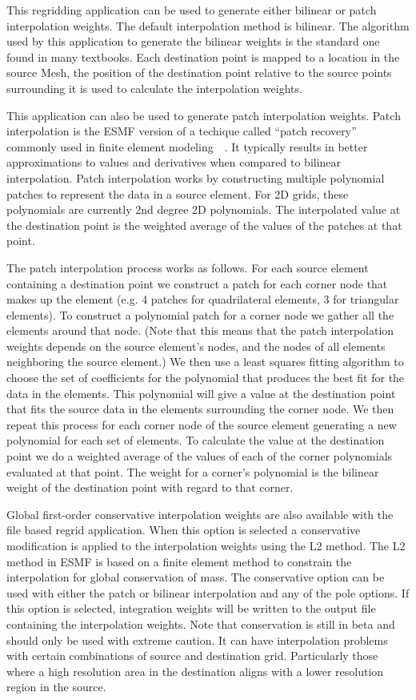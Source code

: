  This regridding application can be used to generate either bilinear or patch interpolation weights. The default interpolation method
is bilinear. The algorithm used by this application to generate the bilinear weights is the standard one found in
many textbooks.  Each destination point is mapped to a location in the source Mesh, the position of the destination point relative 
to the source points surrounding it is used to calculate the interpolation weights. 

 This application can also be used to generate patch interpolation weights. Patch
interpolation is the ESMF version of a techique called ``patch recovery'' commonly
used in finite element modeling~\cite{PatchInterp1}~\cite{PatchInterp2}. It typically results in better approximations to values and derivatives when compared to bilinear interpolation.  
Patch interpolation works by constructing multiple polynomial patches to represent
the data in a source element. For 2D grids, these polynomials 
are currently 2nd degree 2D polynomials. The interpolated value at the destination point 
is the weighted average of the values of the patches at that point. 

The patch interpolation process works as follows. 
For each source element containing a destination point
we construct a patch for each corner node that makes up the element (e.g. 4 patches for 
quadrilateral elements, 3 for triangular elements). To construct a polynomial patch for
 a corner node we gather all the elements around that node. 
(Note that this means that the patch interpolation weights depends on the source 
element's nodes, and the nodes of all elements neighboring the source element.)  
We then use a least squares fitting algorithm to choose the set of coefficients 
for the polynomial that produces the best fit for the data in the elements. 
This polynomial will give a value at the destination point that fits the source data 
in the elements surrounding the corner node. We then repeat this process for each 
corner node of the source element generating a new polynomial for each set of elements.  
To calculate the value at the destination point we do a weighted average of the values 
of each of the corner polynomials evaluated at that point. The weight for a corner's 
polynomial is the bilinear weight of the destination point with regard to that corner.  

Global first-order conservative interpolation weights are also available with the 
file based regrid application. When this option is selected a conservative modification
is applied to the interpolation weights using the L2 method.  The L2 method in ESMF is based
on a finite element method to constrain the interpolation for global conservation of 
mass.  The conservative option can be used with either the patch or bilinear interpolation
and any of the pole options.  If this option is selected, integration weights will be
written to the output file containing the interpolation weights. 
Note that conservation is still in beta and should only be used with extreme caution.
It can have interpolation problems with certain combinations of source and destination grid. 
Particularly those where a high resolution area in the destination aligns with a lower resolution 
region in the source. 

